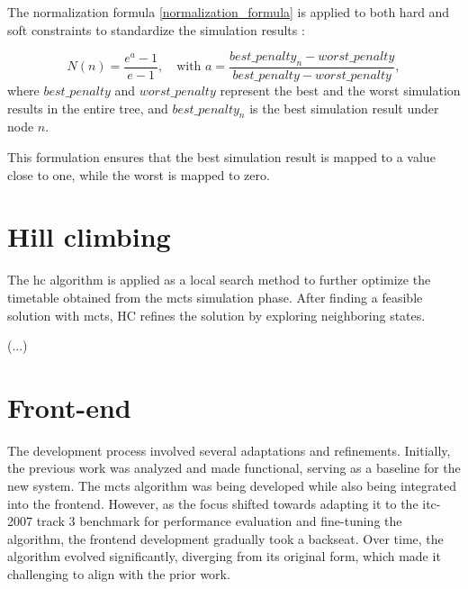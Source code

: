 The normalization formula \ref{normalization_formula} is applied to both hard and soft constraints to standardize the simulation results \cite{pedroso_tree_2015}:

\begin{equation}
N(n) = \frac{e^a - 1}{e - 1}, \quad \text{with } a = \frac{best\_penalty_n - worst\_penalty}{ best\_penalty - worst\_penalty},\label{normalization_formula}
\end{equation}
where \(best\_penalty\) and \(worst\_penalty\) represent the best and the worst simulation results in the entire tree, and \(best\_penalty_n\) is the best simulation result under node \(n\).

This formulation ensures that the best simulation result is mapped to a value close to one, while the worst is mapped to zero.

\section{Hill climbing}\label{hill_climbing_section}

The \ac{hc} algorithm is applied as a local search method to further optimize the timetable obtained from the \ac{mcts} simulation phase. After finding a feasible solution with \ac{mcts}, \ac{HC} refines the solution by exploring neighboring states. 

(...)

\section{Front-end}

The development process involved several adaptations and refinements. Initially, the previous work was analyzed and made functional, serving as a baseline for the new system. The \ac{mcts} algorithm was being developed while also being integrated into the frontend. However, as the focus shifted towards adapting it to the \ac{itc-2007} track 3 benchmark for performance evaluation and fine-tuning the algorithm, the frontend development gradually took a backseat. Over time, the algorithm evolved significantly, diverging from its original form, which made it challenging to align with the prior work.

